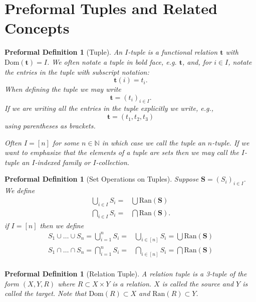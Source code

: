 \documentclass[oneside, 12pt]{book}
\theoremstyle{break}
\newtheorem{preformal definition}[definition]{Preformal Definition}
\newtheorem{preformal theorem}[theorem]{Preformal Theorem}
\newcommand{\bv}[1]{\boldsymbol{#1}}
\newcommand{\N}[0]{\mathbb{N}}
\begin{document}
		\section{Preformal Tuples and Related Concepts}
			\begin{preformal definition}[Tuple]
				An $I$-tuple is a functional relation $\bv{t}$ with $\text{Dom}(\bv{t}) = I$.
				We often notate a tuple in bold face, e.g. $\bv{t}$, and, for $i\in I$, notate the entries in the tuple with subscript notation:
				\begin{equation*}
					\bv{t}(i) = t_i.
				\end{equation*}
				When defining the tuple we may write
				\begin{equation*}
					\bv{t} = (t_i)_{i\in I}.
				\end{equation*}
				If we are writing all the entries in the tuple explicitly we write, e.g.,
				\begin{equation*}
					\bv{t} = (t_1, t_2, t_3)
				\end{equation*}
				using parentheses as brackets.
				
				Often $I = [n]$ for some $n \in \N$ in which case we call the tuple an $n$-tuple. 
				If we want to emphasize that the elements of a tuple are sets then we may call the $I$-tuple an $I$-indexed family or $I$-collection.
			\end{preformal definition}
	

			\begin{preformal definition}[Set Operations on Tuples]
				Suppose $\bv{S} = (S_i)_{i\in I}$.
				We define
				\begin{align*}
					\bigcup_{i\in I} S_i =& \bigcup \text{Ran}(\bv{S})\\
					\bigcap_{i\in I} S_i =& \bigcap \text{Ran}(\bv{S}).
				\end{align*}
				if $I = [n]$ then we define
				\begin{align*}
					S_1 \cup \ldots \cup S_n = \bigcup_{i=1}^n S_i =& \bigcup_{i\in [n]} S_i = \bigcup \text{Ran}(\bv{S})\\
					S_1 \cap \ldots \cap S_n = \bigcap_{i=1}^n S_i =& \bigcap_{i\in [n]} S_i = \bigcap \text{Ran}(\bv{S})\\
				\end{align*}
			\end{preformal definition}
		
			\begin{preformal definition}[Relation Tuple]
				A relation tuple is a 3-tuple of the form $(X, Y, R)$ where $R\subset X\times Y$ is a relation.
				$X$ is called the source and $Y$ is called the target.
				Note that $\text{Dom}(R) \subset X$ and $\text{Ran}(R) \subset Y$. 
			\end{preformal definition}
			
\end{document}
